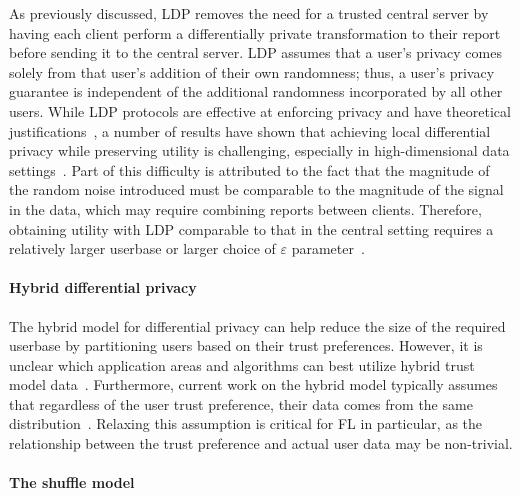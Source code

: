 As previously discussed, LDP removes the need for a trusted central server by having each client perform a differentially private transformation to their report before sending it to the central server. LDP assumes that a user's privacy comes solely from that user's addition of their own randomness; thus, a user's privacy guarantee is independent of the additional randomness incorporated by all other users.
While LDP protocols are effective at enforcing privacy and have theoretical justifications~\cite{rappor:15, applewhitepaper:17,  collecting-telemetry-data-privately}, a number of results have shown that achieving local differential privacy while preserving utility is challenging, especially in high-dimensional data settings~\cite{KLNRS11,Ullman18,kairouz2014extremal, bassily2017practical, kairouz2016discrete, ye2018optimal,duchi2013local, cormode2018marginal}.
Part of this difficulty is attributed to the fact that the magnitude of the random noise introduced must be comparable to the magnitude of the signal in the data, which may require combining reports between clients. Therefore, obtaining utility with LDP comparable to that in the central setting requires a relatively larger userbase or larger choice of $\varepsilon$ parameter~\cite{appleepsilon}.

\paragraph{Hybrid differential privacy} 

The hybrid model for differential privacy can help reduce the size of the required userbase by partitioning users based on their trust preferences. However, it is unclear which application areas and algorithms can best utilize hybrid trust model data~\cite{avent2017blender}. Furthermore, current work on the hybrid model typically assumes that regardless of the user trust preference, their data comes from the same distribution~\cite{avent2017blender, dubey2018hybrid, beimel2019power}. Relaxing this assumption is critical for FL in particular, as the relationship between the trust preference and actual user data may be non-trivial.

\paragraph{The shuffle model} 

